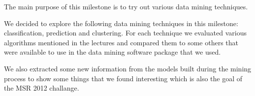 The main purpose of this milestone is to try out various data mining techniques.

We decided to explore the following data mining techniques in this milestone: classification, prediction and clustering. For each technique we evaluated various algorithms mentioned in the lectures and compared them to some others that were available to use in the data mining software package that we used. 

We also extracted some new information from the models built during the mining process to show some things that we found interesting which is also the goal of the MSR 2012 challange.


